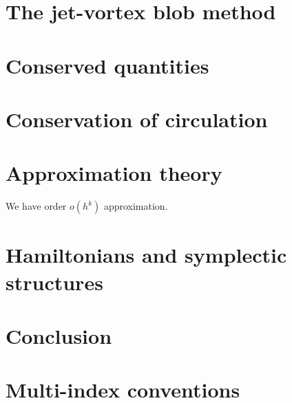 \documentclass[12pt]{amsart}
\begin{document}
\section{The jet-vortex blob method}
\label{sec:jet_vortex_blob}


\section{Conserved quantities}
\label{sec:conserved_quantities}


\section{Conservation of circulation}
\label{sec:circulation}


\section{Approximation theory}
\label{sec:approximation_theory}

We have order $o(h^k)$ approximation.

\section{Hamiltonians and symplectic structures}
\label{sec:symplectic}


\section{Conclusion}

\appendix
\section{Multi-index conventions}
\label{app:multi}



\end{document}
